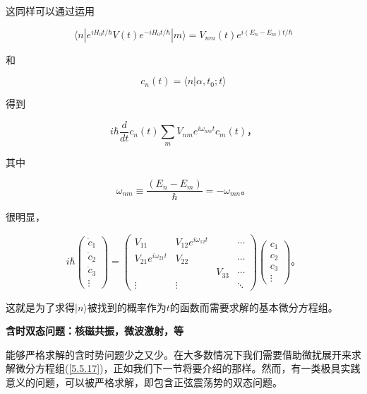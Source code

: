 ﻿\documentclass[UTF8,twoside]{ctexart}
\begin{document}
\noindent 这同样可以通过运用

$$\langle n|e^{iH_0 t/\hbar}V(t)e^{-iH_0 t/\hbar}|m\rangle=V_{nm}(t)e^{i(E_n-E_m)t/\hbar}$$

\noindent 和

$$c_n(t)=\langle n|\alpha,t_0;t\rangle$$

\noindent [从(\ref{5.5.13})]得到

\begin{equation} \label{5.5.15}
i\hbar\dfrac{d}{dt}c_n(t)\displaystyle\sum_m V_{nm}e^{i\omega_{nm}t}c_m(t)\text{，}
\end{equation}

\noindent 其中

\begin{equation} \label{5.5.16}
\omega_{nm}\equiv\dfrac{(E_n-E_m)}{\hbar}=-\omega_{mn}\text{。}
\end{equation}

\noindent 很明显，

\begin{equation} \label{5.5.17}
i\hbar\left(\begin{array}{c}
\dot{c}_1\\
\dot{c}_2\\
\dot{c}_3\\
\vdots\end{array}\right)=\left(\begin{array}{cccc}
V_{11} & V_{12}e^{i\omega_{12}t} & & \cdots \\
V_{21}e^{i\omega_{21}t} & V_{22} & & \cdots \\
 & & V_{33} & \cdots \\
\vdots & \vdots & &\ddots\end{array}\right)\left(\begin{array}{c}
c_1\\
c_2\\
c_3\\
\vdots\end{array}\right)\text{。}
\end{equation}

\noindent 这就是为了求得$|n\rangle$被找到的概率作为$t$的函数而需要求解的基本微分方程组。

\noindent \textbf{含时双态问题：核磁共振，微波激射，等}

\noindent 能够严格求解的含时势问题少之又少。在大多数情况下我们需要借助微扰展开来求解微分方程组(\ref{5.5.17})，正如我们下一节将要介绍的那样。然而，有一类极具实践意义的问题，可以被严格求解，即包含正弦震荡势的双态问题。
\end{document}
